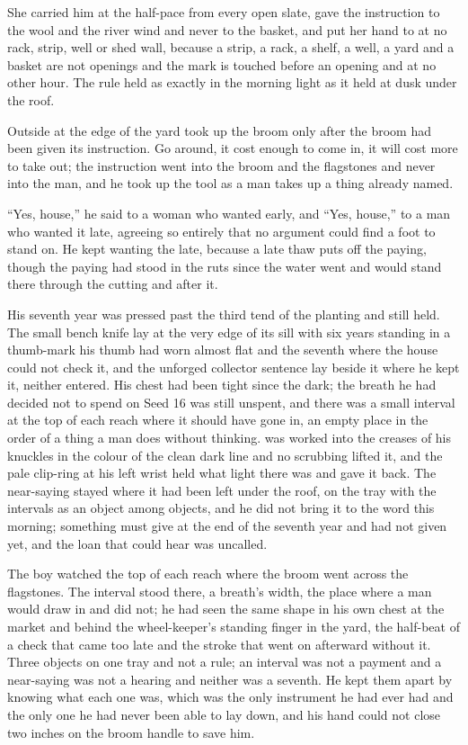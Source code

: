 She carried him at the half-pace from every open slate, gave the instruction to the wool and the river wind and never to the basket, and put her hand to  at no rack, strip, well or shed wall, because a strip, a rack, a shelf, a well, a yard and a basket are not openings and the mark is touched before an opening and at no other hour. The rule held as exactly in the morning light as it held at dusk under the roof.

\scenebreak

Outside at the edge of the yard  took up the broom only after the broom had been given its instruction. Go around, it cost enough to come in, it will cost more to take out; the instruction went into the broom and the flagstones and never into the man, and he took up the tool as a man takes up a thing already named.

“Yes, house,” he said to a woman who wanted  early, and “Yes, house,” to a man who wanted it late, agreeing so entirely that no argument could find a foot to stand on. He kept wanting the late, because a late thaw puts off the paying, though the paying had stood in the ruts since the water went and would stand there through the cutting and after it.

His seventh year was pressed past the third tend of the planting and still held. The small bench knife lay at the very edge of its sill with six years standing in a thumb-mark his thumb had worn almost flat and the seventh where the house could not check it, and the unforged collector sentence lay beside it where he kept it, neither entered. His chest had been tight since the dark; the breath he had decided not to spend on Seed 16 was still unspent, and there was a small interval at the top of each reach where it should have gone in, an empty place in the order of a thing a man does without thinking.  was worked into the creases of his knuckles in the colour of the clean dark line and no scrubbing lifted it, and the pale clip-ring at his left wrist held what light there was and gave it back. The near-saying stayed where it had been left under the roof, on the tray with the intervals as an object among objects, and he did not bring it to the word this morning; something must give at the end of the seventh year and had not given yet, and the loan that could hear was uncalled.

The boy watched the top of each reach where the broom went across the flagstones. The interval stood there, a breath's width, the place where a man would draw in and did not; he had seen the same shape in his own chest at the market and behind the wheel-keeper's standing finger in the yard, the half-beat of a check that came too late and the stroke that went on afterward without it. Three objects on one tray and not a rule; an interval was not a payment and a near-saying was not a hearing and neither was a seventh. He kept them apart by knowing what each one was, which was the only instrument he had ever had and the only one he had never been able to lay down, and his hand could not close two inches on the broom handle to save him.

